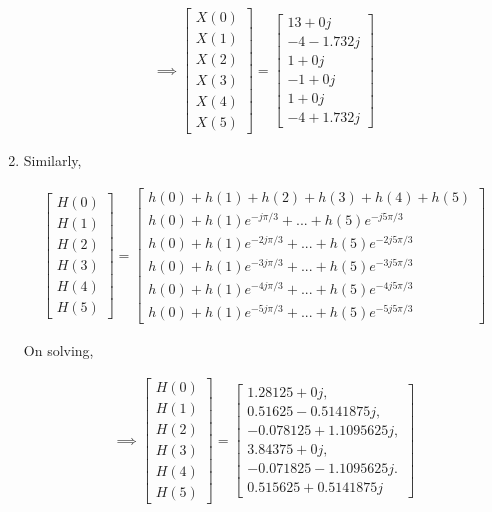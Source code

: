 \documentclass[journal,12pt,twocolumn]{IEEEtran}
\renewcommand\thesection{\arabic{section}}
\begin{document}
\begin{enumerate}[label=\thesection.\arabic*.,ref=\thesection.\theenumi]
\begin{align}
    \implies \begin{bmatrix} X(0) \\ X(1) \\ X(2) \\ X(3) \\ X(4) \\ X(5) \end{bmatrix}
         =
\begin{bmatrix}
13 + 0j \\ -4 - 1.732j \\ 1 + 0j \\ -1 + 0j \\ 1 + 0j \\ -4 + 1.732j
\end{bmatrix}
\end{align}

\item
Similarly,

\begin{align}
    \begin{bmatrix} H(0) \\ H(1) \\ H(2) \\ H(3) \\ H(4) \\ H(5) \end{bmatrix}
=
\begin{bmatrix}
h(0) + h(1) + h(2) + h(3) + h(4) + h(5) \\h(0) + h(1)e^{-j\pi /3} + ... + h(5)e^{-j5\pi /3}\\h(0) + h(1)e^{-2j\pi /3} + ... + h(5)e^{-2j5\pi /3}\\h(0) + h(1)e^{-3j\pi /3} + ... + h(5)e^{-3j5\pi /3}\\
h(0) + h(1)e^{-4j\pi /3} + ... + h(5)e^{-4j5\pi /3}\\h(0) + h(1)e^{-5j\pi /3} + ... + h(5)e^{-5j5\pi /3}
\end{bmatrix}
\end{align}

On solving,

\begin{align}
\implies
\begin{bmatrix} H(0) \\ H(1) \\ H(2) \\ H(3) \\ H(4) \\ H(5) \end{bmatrix}
=
\begin{bmatrix}
1.28125 + 0j,\\
0.51625 - 0.5141875j,\\
-0.078125 + 1.1095625j,\\
 3.84375 + 0j,\\
-0.071825 - 1.1095625j.\\
 0.515625 + 0.5141875j
\end{bmatrix}
\end{align}


\end{enumerate}
\end{document}
